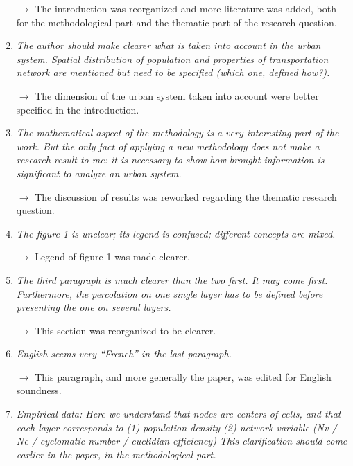 \documentclass[11pt,a4paper,sans]{moderncv}        %
\begin{document}
\begin{enumerate}
$\rightarrow$ The introduction was reorganized and more literature was added, both for the methodological part and the thematic part of the research question.

\medskip

\item \textit{The author should make clearer what is taken into account in the urban system. Spatial distribution of population and properties of transportation network are mentioned but need to be specified (which one, defined how?).}

$\rightarrow$ The dimension of the urban system taken into account were better specified in the introduction.

\medskip


\item \textit{The mathematical aspect of the methodology is a very interesting part of the work. But the only fact of applying a new methodology does not make a research result to me: it is necessary to show how brought information is significant to analyze an urban system.}

$\rightarrow$ The discussion of results was reworked regarding the thematic research question.

\medskip

\item \textit{The figure 1 is unclear; its legend is confused; different concepts are mixed.}

$\rightarrow$ Legend of figure 1 was made clearer.

\medskip


\item \textit{The third paragraph is much clearer than the two first. It may come first. Furthermore, the percolation on one single layer has to be defined before presenting the one on several layers.}

$\rightarrow$ This section was reorganized to be clearer.

\medskip

\item \textit{English seems very ``French'' in the last paragraph.}

$\rightarrow$ This paragraph, and more generally the paper, was edited for English soundness.

\medskip


\item \textit{Empirical data: Here we understand that nodes are centers of cells, and that each layer corresponds to (1) population density (2) network variable (Nv / Ne / cyclomatic number / euclidian efficiency) This clarification should come earlier in the paper, in the methodological part.}


\end{enumerate}
\end{document}
